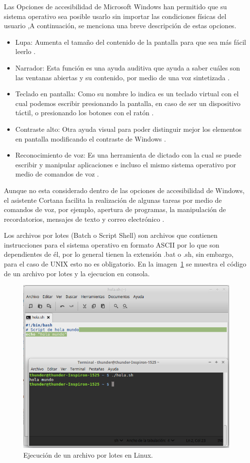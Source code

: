 
Las Opciones de accesibilidad de Microsoft Windows han permitido que su
 sistema operativo sea posible usarlo sin importar las condiciones físicas del
 usuario \cite{DanielHubbell2016},A continuación, se menciona una breve 
 descripción de estas opciones.

\begin{itemize}
	\item Lupa: Aumenta el tamaño del contenido de la pantalla para que sea más
	 fácil leerlo \cite{xatakaaccesiblilidad}.
	\item Narrador:  Esta función es una ayuda auditiva que ayuda a saber cuáles
	 son las ventanas abiertas y su contenido, por medio de una voz sintetizada
	 \cite{xatakaaccesiblilidad}.
	\item Teclado en pantalla: Como su nombre lo indica es un teclado virtual
	 con el cual podemos escribir presionando la pantalla, en caso de ser un
	 dispositivo táctil, o presionando los botones con el ratón
	 \cite{xatakaaccesiblilidad}.
	 \item Contraste alto: Otra ayuda visual para poder distinguir mejor los
	  elementos en pantalla modificando el contraste de Windows
	  \cite{xatakaaccesiblilidad}.
	  \item Reconocimiento de voz: Es una herramienta de dictado con la cual se
	   puede escribir y manipular aplicaciones e incluso el mismo sistema
	   operativo por medio de comandos de voz \cite{support14213}.
\end{itemize}
	   
Aunque no esta considerado dentro de las opciones de accesibilidad de Windows,
 el asistente Cortana facilita la realización de algunas tareas por medio de
 comandos de voz, por ejemplo, apertura de programas, la manipulación de
 recordatorios, mensajes de texto y correo electrónico \cite{support17214}. 

Los archivos por lotes (Batch o Script Shell) \cite{Silberschatz1999} son
 archivos que contienen instrucciones para el sistema operativo en formato
 ASCII por lo que son dependientes de él, por lo general tienen la extensión
 .bat o .sh, sin embargo, para el caso de UNIX esto no es obligatorio. En la
 imagen~\ref{fig:script} se muestra el código de un archivo por lotes y la 
 ejecucion en consola.


\begin{figure}[H]
\centering
\includegraphics[width=0.7\columnwidth]{CapituloI/Imagenes/Script.png}
\caption{Ejecución de un archivo por lotes en Linux.}
\label{fig:script}
\end{figure}



